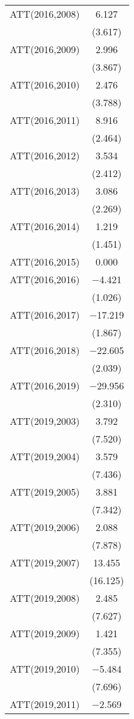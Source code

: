 \begin{table}
\begin{tabular}[t]{lc}
ATT(2016,2008) & \num{6.127}\\
 & (\num{3.617})\\
ATT(2016,2009) & \num{2.996}\\
 & (\num{3.867})\\
ATT(2016,2010) & \num{2.476}\\
 & (\num{3.788})\\
ATT(2016,2011) & \num{8.916}\\
 & (\num{2.464})\\
ATT(2016,2012) & \num{3.534}\\
 & (\num{2.412})\\
ATT(2016,2013) & \num{3.086}\\
 & (\num{2.269})\\
ATT(2016,2014) & \num{1.219}\\
 & (\num{1.451})\\
ATT(2016,2015) & \num{0.000}\\
ATT(2016,2016) & \num{-4.421}\\
 & (\num{1.026})\\
ATT(2016,2017) & \num{-17.219}\\
 & (\num{1.867})\\
ATT(2016,2018) & \num{-22.605}\\
 & (\num{2.039})\\
ATT(2016,2019) & \num{-29.956}\\
 & (\num{2.310})\\
ATT(2019,2003) & \num{3.792}\\
 & (\num{7.520})\\
ATT(2019,2004) & \num{3.579}\\
 & (\num{7.436})\\
ATT(2019,2005) & \num{3.881}\\
 & (\num{7.342})\\
ATT(2019,2006) & \num{2.088}\\
 & (\num{7.878})\\
ATT(2019,2007) & \num{13.455}\\
 & (\num{16.125})\\
ATT(2019,2008) & \num{2.485}\\
 & (\num{7.627})\\
ATT(2019,2009) & \num{1.421}\\
 & (\num{7.355})\\
ATT(2019,2010) & \num{-5.484}\\
 & (\num{7.696})\\
ATT(2019,2011) & \num{-2.569}\\

\end{tabular}
\end{table}
